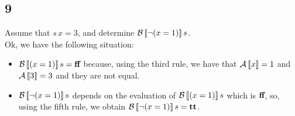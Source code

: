 \subsection{9}

Assume that $s\,x = 3$, and determine $\B\eval{\neg(x = 1)}s$.\\

Ok, we have the following situation:
\begin{itemize}
	\item $\B\eval{(x = 1)}s = \ff$ because, using the third rule, we have that $\A\eval{x} = 1$ and $\A\eval{3} = 3$ and they are not equal.
	\item $\B\eval{\neg(x = 1)}s$ depends on the evaluation of $\B\eval{(x = 1)}s$ which is $\ff$, so, using the fifth rule, we obtain $\B\eval{\neg(x = 1)}s = \Tt$.
\end{itemize}